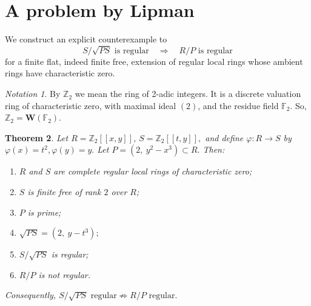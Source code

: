 \documentclass[10pt,a4paper]{amsart}
\newtheorem{theorem}{Theorem}[section]
\theoremstyle{definition}
\theoremstyle{remark}
\newtheorem{notation}[theorem]{Notation}
\begin{document}
\section{A  problem by Lipman}

	We construct an explicit counterexample to
	\[
	S/\sqrt{PS}\text{ is regular}\quad\Longrightarrow\quad R/P\text{ is regular}
	\]
	for a finite flat, indeed finite free, extension of regular local rings
	whose ambient rings have characteristic zero.  
	
	\begin{notation}
		By $\mathbb Z_2$ we mean the ring of 2-adic integers. It is a discrete valuation ring of characteristic zero, with maximal ideal $(2)$, and the residue field $\mathbb F_2$. So, 
$\mathbb Z_2=\boldsymbol{W}(\mathbb F_2)$.	\end{notation}


 



\begin{theorem}\label{42}
	Let
	\(
	R=\mathbb Z_2[[x,y]]\),
\(
	S=\mathbb Z_2[[t,y]],
	\)
	and define
	\(\varphi:R\to S\)
	by
	\(
	\varphi(x)=t^2, 
	\varphi(y)=y.
	\)
	Let
	\(
	P=(2,\ y^2-x^3)\subset R.
	\)
	Then:
	\begin{enumerate}
		\item \(R\) and \(S\) are complete regular local rings of characteristic zero;
		\item \(S\) is finite free of rank \(2\) over \(R\);
		\item \(P\) is prime;
		\item
		\(
		\sqrt{PS}=(2,\ y-t^3);
		\)
		\item
		\(
		S/\sqrt{PS}
		\)
		is regular;
		\item
		\(
		R/P
		\)
		is not regular.
	\end{enumerate}
	Consequently,
	\({
		S/\sqrt{PS}\text{ regular}
		\not\Longrightarrow
		R/P\text{ regular}.
	}
	\)
\end{theorem}
\end{document}
